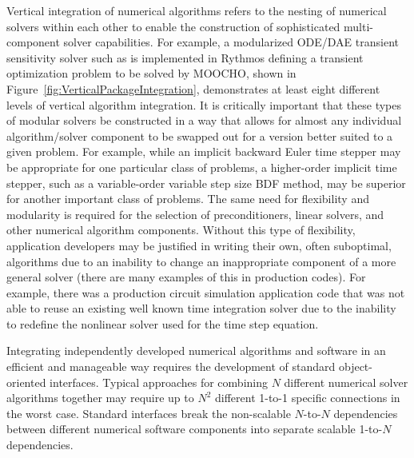 \documentclass[pdf,ps2pdf,11pt]{SANDreport}
\begin{document}
Vertical integration of numerical algorithms refers to the nesting of
numerical solvers within each other to enable the construction of
sophisticated multi-component solver capabilities.  For example, a modularized
ODE/DAE transient sensitivity solver such as is implemented in Rythmos defining
a transient optimization problem to be solved by MOOCHO, shown in
Figure~\ref{fig:VerticalPackageIntegration}, demonstrates at least eight
different levels of vertical algorithm integration.  It is critically
important that these types of modular solvers be constructed in a way that
allows for almost any individual algorithm/solver component to be swapped out
for a version better suited to a given problem.  For example, while an
implicit backward Euler time stepper may be appropriate for one particular
class of problems, a higher-order implicit time stepper, such as a
variable-order variable step size BDF method, may be superior for another
important class of problems.  The same need for flexibility and modularity is
required for the selection of preconditioners, linear solvers, and other
numerical algorithm components.  Without this type of flexibility, application
developers may be justified in writing their own, often suboptimal, algorithms due to
an inability to change an inappropriate component of a more general solver
(there are many examples of this in production codes).  For example, there was
a production circuit simulation application code that was not able to reuse an
existing well known time integration solver due to the inability to redefine
the nonlinear solver used for the time step equation.  



Integrating independently developed numerical algorithms and software in an
efficient and manageable way requires the development of standard
object-oriented interfaces.  Typical approaches for combining $N$ different
numerical solver algorithms together may require up to $N^2$ different 1-to-1
specific connections in the worst case.  Standard interfaces break the
non-scalable $N$-to-$N$ dependencies between different numerical software
components into separate scalable 1-to-$N$ dependencies.

\end{document}
